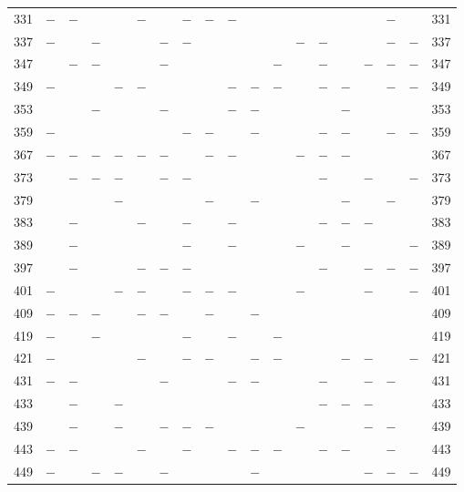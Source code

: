 \begin{center}
\begin{tabular}{r|c|c|c|c|c|c|c|c|c|c|c|c|c|c|c|c|c|r}
331 & $-$ & $-$ &  &  & $-$ &  & $-$ & $-$ & $-$ &  &  &  &  &  &  & $-$ &  & 331\\
337 & $-$ &  & $-$ &  &  & $-$ & $-$ &  &  &  &  & $-$ & $-$ &  &  & $-$ & $-$ & 337\\
347 &  & $-$ & $-$ &  &  & $-$ &  &  &  &  & $-$ &  & $-$ &  & $-$ & $-$ & $-$ & 347\\
349 & $-$ &  &  & $-$ & $-$ &  &  &  & $-$ & $-$ & $-$ &  & $-$ & $-$ &  & $-$ & $-$ & 349\\
353 &  &  & $-$ &  &  & $-$ &  &  & $-$ & $-$ &  &  &  & $-$ &  &  &  & 353\\
359 & $-$ &  &  &  &  &  & $-$ & $-$ &  & $-$ &  &  & $-$ & $-$ &  & $-$ & $-$ & 359\\
367 & $-$ & $-$ & $-$ & $-$ & $-$ & $-$ &  & $-$ & $-$ &  &  & $-$ & $-$ & $-$ &  &  &  & 367\\
373 &  & $-$ & $-$ & $-$ &  & $-$ & $-$ &  &  &  &  &  & $-$ &  & $-$ &  & $-$ & 373\\
379 &  &  &  & $-$ &  &  &  & $-$ &  & $-$ &  &  &  & $-$ &  & $-$ &  & 379\\
383 &  & $-$ &  &  & $-$ &  & $-$ &  & $-$ &  &  &  & $-$ & $-$ & $-$ &  &  & 383\\
389 &  & $-$ &  &  &  &  & $-$ &  & $-$ &  &  & $-$ &  & $-$ &  &  & $-$ & 389\\
397 &  & $-$ &  &  & $-$ & $-$ & $-$ &  &  &  &  &  & $-$ &  & $-$ & $-$ & $-$ & 397\\
401 & $-$ &  &  & $-$ & $-$ &  & $-$ & $-$ & $-$ &  &  & $-$ &  &  & $-$ &  & $-$ & 401\\
409 & $-$ & $-$ & $-$ &  & $-$ & $-$ &  & $-$ &  & $-$ &  &  &  &  &  &  &  & 409\\
419 & $-$ &  & $-$ &  &  &  & $-$ &  & $-$ &  & $-$ &  &  &  &  &  &  & 419\\
421 & $-$ &  &  &  & $-$ &  & $-$ & $-$ &  & $-$ & $-$ &  &  & $-$ & $-$ &  & $-$ & 421\\
431 & $-$ & $-$ &  &  &  & $-$ &  &  & $-$ & $-$ &  &  & $-$ &  & $-$ & $-$ &  & 431\\
433 &  & $-$ &  & $-$ &  &  &  &  &  &  &  &  & $-$ & $-$ & $-$ &  &  & 433\\
439 &  & $-$ &  & $-$ &  & $-$ & $-$ & $-$ &  &  &  & $-$ &  &  & $-$ & $-$ &  & 439\\
443 & $-$ & $-$ &  &  & $-$ &  & $-$ &  & $-$ & $-$ & $-$ &  & $-$ & $-$ &  & $-$ &  & 443\\
449 & $-$ &  & $-$ & $-$ &  & $-$ &  &  &  & $-$ &  &  &  &  & $-$ & $-$ & $-$ & 449\\

\end{tabular}
\end{center}
